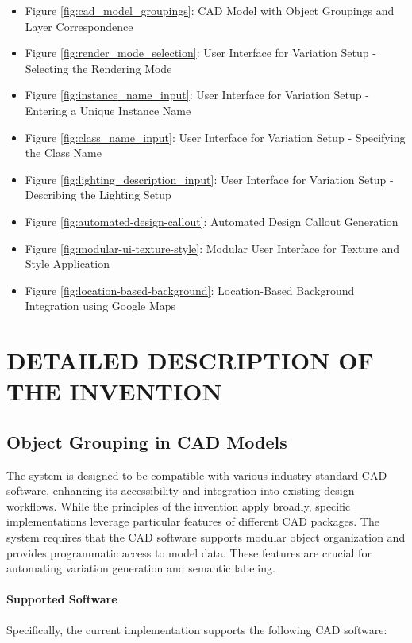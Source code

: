 \documentclass[12pt]{article}
\begin{document}
\begin{itemize}
    \item Figure \ref{fig:cad_model_groupings}: CAD Model with Object Groupings and Layer Correspondence
    \item Figure \ref{fig:render_mode_selection}: User Interface for Variation Setup - Selecting the Rendering Mode
    \item Figure \ref{fig:instance_name_input}: User Interface for Variation Setup - Entering a Unique Instance Name
    \item Figure \ref{fig:class_name_input}: User Interface for Variation Setup - Specifying the Class Name
    \item Figure \ref{fig:lighting_description_input}: User Interface for Variation Setup - Describing the Lighting Setup
    \item Figure \ref{fig:automated-design-callout}: Automated Design Callout Generation
    \item Figure \ref{fig:modular-ui-texture-style}: Modular User Interface for Texture and Style Application
    \item Figure \ref{fig:location-based-background}: Location-Based Background Integration using Google Maps
\end{itemize}


\section{DETAILED DESCRIPTION OF THE INVENTION}


\subsection{Object Grouping in CAD Models}

The system is designed to be compatible with various industry-standard CAD software, enhancing its accessibility and integration into existing design workflows. While the principles of the invention apply broadly, specific implementations leverage particular features of different CAD packages. The system requires that the CAD software supports modular object organization and provides programmatic access to model data. These features are crucial for automating variation generation and semantic labeling.

\paragraph{Supported Software}
Specifically, the current implementation supports the following CAD software:
\end{document}
